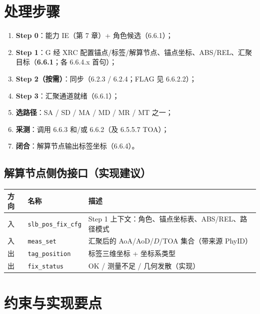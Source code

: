 \documentclass[11pt,a4paper]{ctexart}
\begin{document}
\section{处理步骤}

\begin{enumerate}[nosep]
  \item \textbf{Step 0}：能力 IE（第 7 章）+ 角色候选（6.6.1）；
  \item \textbf{Step 1}：G 经 XRC 配置锚点/标签/解算节点、锚点坐标、ABS/REL、汇聚目标（\textbf{6.6.1}；各 6.6.4.x 首句）；
  \item \textbf{Step 2（按需）}：同步（6.2.3 / 6.2.4；FLAG 见 6.6.2.2）；
  \item \textbf{Step 3}：汇聚通道就绪（6.6.1）；
  \item \textbf{选路径}：SA / SD / MA / MD / MR / MT 之一；
  \item \textbf{采测}：调用 6.6.3 和/或 6.6.2（及 6.5.5.7 TOA）；
  \item \textbf{闭合}：解算节点输出标签坐标（6.6.4）。
\end{enumerate}

\subsection{解算节点侧伪接口（实现建议）}

\begin{table}[h]
\centering
\small
\begin{tabular}{L{2.2cm}L{4.0cm}L{7.0cm}}
\toprule
\textbf{方向} & \textbf{名称} & \textbf{描述} \\
\midrule
入 & \texttt{slb\_pos\_fix\_cfg} & Step 1 上下文：角色、锚点坐标表、ABS/REL、路径模式 \\
入 & \texttt{meas\_set} & 汇聚后的 AoA/AoD/$D$/TOA 集合（带来源 PhyID） \\
出 & \texttt{tag\_position} & 标签三维坐标 + 坐标系类型 \\
出 & \texttt{fix\_status} & OK / 测量不足 / 几何发散（实现） \\
\bottomrule
\end{tabular}
\end{table}

\section{约束与实现要点}
\end{document}

